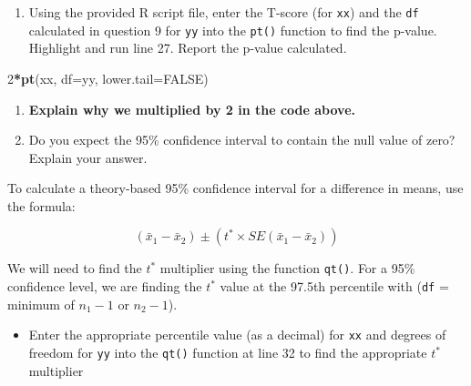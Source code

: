 \documentclass[
]{report}
\newenvironment{Shaded}{\begin{snugshade}}{\end{snugshade}}
\newcommand{\AttributeTok}[1]{\textcolor[rgb]{0.13,0.29,0.53}{#1}}
\newcommand{\ConstantTok}[1]{\textcolor[rgb]{0.56,0.35,0.01}{#1}}
\newcommand{\DecValTok}[1]{\textcolor[rgb]{0.00,0.00,0.81}{#1}}
\newcommand{\FunctionTok}[1]{\textcolor[rgb]{0.13,0.29,0.53}{\textbf{#1}}}
\newcommand{\NormalTok}[1]{#1}
\newcommand{\SpecialCharTok}[1]{\textcolor[rgb]{0.81,0.36,0.00}{\textbf{#1}}}
\providecommand{\tightlist}{%
  \setlength{\itemsep}{0pt}\setlength{\parskip}{0pt}}
\begin{document}
\vspace{0.2in}

\begin{enumerate}
\def\labelenumi{\arabic{enumi}.}
\setcounter{enumi}{9}
\tightlist
\item
  Using the provided R script file, enter the T-score (for \texttt{xx}) and the \texttt{df} calculated in question 9 for \texttt{yy} into the \texttt{pt()} function to find the p-value. Highlight and run line 27. Report the p-value calculated.
\end{enumerate}

\begin{Shaded}
\begin{Highlighting}[]
\DecValTok{2}\SpecialCharTok{*}\FunctionTok{pt}\NormalTok{(xx, }\AttributeTok{df=}\NormalTok{yy, }\AttributeTok{lower.tail=}\ConstantTok{FALSE}\NormalTok{)}
\end{Highlighting}
\end{Shaded}

\vspace{0.2in}

\begin{enumerate}
\def\labelenumi{\arabic{enumi}.}
\setcounter{enumi}{10}
\item
  \textbf{Explain why we multiplied by 2 in the code above.}
  \vspace{0.3in}
\item
  Do you expect the 95\% confidence interval to contain the null value of zero? Explain your answer.
  \vspace{0.8in}
\end{enumerate}

To calculate a theory-based 95\% confidence interval for a difference in means, use the formula:

\[(\bar{x}_1- \bar{x}_2)\pm (t^* \times SE(\bar{x}_1- \bar{x}_2))\]

We will need to find the \(t^*\) multiplier using the function \texttt{qt()}. For a 95\% confidence level, we are finding the \(t^*\) value at the 97.5th percentile with (\texttt{df} = minimum of \(n_1 - 1\) or \(n_2 - 1\)).

\begin{itemize}
\tightlist
\item
  Enter the appropriate percentile value (as a decimal) for \texttt{xx} and degrees of freedom for \texttt{yy} into the \texttt{qt()} function at line 32 to find the appropriate \(t^*\) multiplier
\end{itemize}
\end{document}
